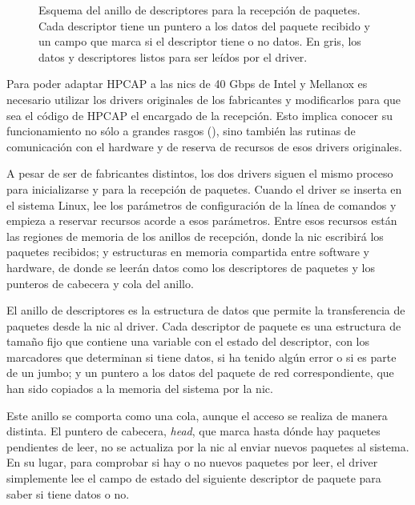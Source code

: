 \documentclass[oneside, draft]{epstfg}
\begin{document}
\begin{figure}[btp]
\centering

\caption[Esquema del anillo de descriptores para recepción de paquetes]{Esquema del anillo de descriptores para la recepción de paquetes. Cada descriptor tiene un puntero a los datos del paquete recibido y un campo que marca si el descriptor tiene o no datos. En gris, los datos y descriptores listos para ser leídos por el \gls{driver}.}
\label{fig:DriverRings}
\end{figure}

Para poder adaptar HPCAP a las \glspl{nic} de 40 Gbps de Intel y Mellanox es necesario utilizar los \glspl{driver} originales de los fabricantes y modificarlos para que sea el código de HPCAP el encargado de la recepción. Esto implica conocer su funcionamiento no sólo a grandes rasgos (), sino también las rutinas de comunicación con el hardware y de reserva de recursos de esos \glspl{driver} originales.

A pesar de ser de fabricantes distintos, los dos \glspl{driver} siguen el mismo proceso para inicializarse y para la recepción de paquetes. Cuando el \gls{driver} se inserta en el sistema Linux, lee los parámetros de configuración de la línea de comandos y empieza a reservar recursos acorde a esos parámetros. Entre esos recursos están las regiones de memoria de los anillos de recepción, donde la \gls{nic} escribirá los paquetes recibidos; y estructuras en memoria compartida entre software y hardware, de donde se leerán datos como los descriptores de paquetes y los punteros de cabecera y cola del anillo.

El anillo de descriptores es la estructura de datos que permite la transferencia de paquetes desde la \gls{nic} al \gls{driver}. Cada descriptor de paquete es una estructura de tamaño fijo que contiene una variable con el estado del descriptor, con los marcadores que determinan si tiene datos, si ha tenido algún error o si es parte de un \gls{jumbo}; y un puntero a los datos del paquete de red correspondiente, que han sido copiados a la memoria del sistema por la \gls{nic}.

Este anillo se comporta como una cola, aunque el acceso se realiza de manera distinta. El puntero de cabecera, \textit{head}, que marca hasta dónde hay paquetes pendientes de leer, no se actualiza por la \gls{nic} al enviar nuevos paquetes al sistema. En su lugar, para comprobar si hay o no nuevos paquetes por leer, el \gls{driver} simplemente lee el campo de estado del siguiente descriptor de paquete para saber si tiene datos o no.
\end{document}
